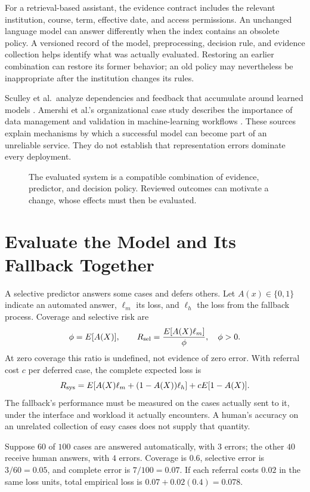 For a retrieval-based assistant, the evidence contract includes the relevant institution, course, term, effective date, and access permissions. An unchanged language model can answer differently when the index contains an obsolete policy. A versioned record of the model, preprocessing, decision rule, and evidence collection helps identify what was actually evaluated. Restoring an earlier combination can restore its former behavior; an old policy may nevertheless be inappropriate after the institution changes its rules.

Sculley et al.\ analyze dependencies and feedback that accumulate around learned models \citep{sculley2015}. Amershi et al.'s organizational case study describes the importance of data management and validation in machine-learning workflows \citep{amershi2019}. These sources explain mechanisms by which a successful model can become part of an unreliable service. They do not establish that representation errors dominate every deployment.

\begin{figure}[t]
\centering

\caption{The evaluated system is a compatible combination of evidence, predictor, and decision policy. Reviewed outcomes can motivate a change, whose effects must then be evaluated.}
\label{fig:complete-system-architecture}
\end{figure}

\section{Evaluate the Model and Its Fallback Together}

A selective predictor answers some cases and defers others. Let $A(x)\in\{0,1\}$ indicate an automated answer, $\ell_m$ its loss, and $\ell_h$ the loss from the fallback process. Coverage and selective risk are
\[
\phi=E[A(X)],\qquad
R_{\rm sel}=\frac{E[A(X)\ell_m]}{\phi},\quad \phi>0.
\]
At zero coverage this ratio is undefined, not evidence of zero error. With referral cost $c$ per deferred case, the complete expected loss is
\[
R_{\rm sys}
=E\!\left[A(X)\ell_m+(1-A(X))\ell_h\right]
+cE[1-A(X)].
\]
The fallback's performance must be measured on the cases actually sent to it, under the interface and workload it actually encounters. A human's accuracy on an unrelated collection of easy cases does not supply that quantity.

Suppose $60$ of $100$ cases are answered automatically, with $3$ errors; the other $40$ receive human answers, with $4$ errors. Coverage is $0.6$, selective error is $3/60=0.05$, and complete error is $7/100=0.07$. If each referral costs $0.02$ in the same loss units, total empirical loss is $0.07+0.02(0.4)=0.078$.


